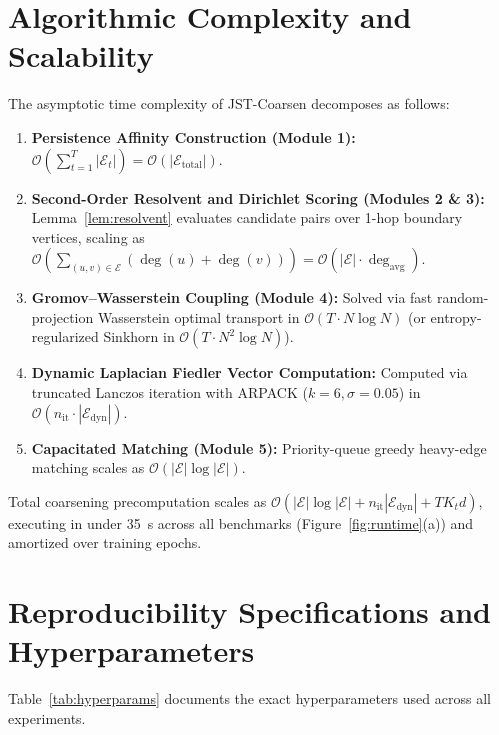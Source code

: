 \documentclass[sigconf]{acmart}
\begin{document}
\section{Algorithmic Complexity and Scalability}
\label{app:complexity}
The asymptotic time complexity of JST-Coarsen decomposes as follows:
\begin{enumerate}
    \item \textbf{Persistence Affinity Construction (Module 1):} $\mathcal{O}\left(\sum_{t=1}^T |\mathcal{E}_t|\right) = \mathcal{O}(|\mathcal{E}_{\text{total}}|)$.
    \item \textbf{Second-Order Resolvent and Dirichlet Scoring (Modules 2 \& 3):} Lemma~\ref{lem:resolvent} evaluates candidate pairs over 1-hop boundary vertices, scaling as $\mathcal{O}\left(\sum_{(u, v) \in \mathcal{E}} (\operatorname{deg}(u) + \operatorname{deg}(v))\right) = \mathcal{O}(|\mathcal{E}| \cdot \operatorname{deg}_{\text{avg}})$.
    \item \textbf{Gromov--Wasserstein Coupling (Module 4):} Solved via fast random-projection Wasserstein optimal transport in $\mathcal{O}(T \cdot N \log N)$ (or entropy-regularized Sinkhorn in $\mathcal{O}(T \cdot N^2 \log N)$).
    \item \textbf{Dynamic Laplacian Fiedler Vector Computation:} Computed via truncated Lanczos iteration with ARPACK ($k=6, \sigma=0.05$) in $\mathcal{O}(n_{\text{it}} \cdot |\mathcal{E}_{\text{dyn}}|)$.
    \item \textbf{Capacitated Matching (Module 5):} Priority-queue greedy heavy-edge matching scales as $\mathcal{O}(|\mathcal{E}| \log |\mathcal{E}|)$.
\end{enumerate}
Total coarsening precomputation scales as $\mathcal{O}(|\mathcal{E}| \log |\mathcal{E}| + n_{\text{it}} |\mathcal{E}_{\text{dyn}}| + T K_t d)$, executing in under 35~s across all benchmarks (Figure~\ref{fig:runtime}(a)) and amortized over training epochs.

\section{Reproducibility Specifications and Hyperparameters}
\label{app:reproducibility}
Table~\ref{tab:hyperparams} documents the exact hyperparameters used across all experiments.
\end{document}
